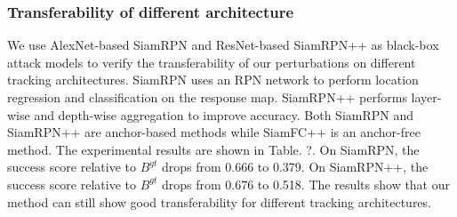 \documentclass{article}
\begin{document}
\begin{table}[ht]
\begin{center}
\end{center}
\caption{Different backbone}
\end{table}

\subsubsection{Transferability of different architecture}

We use AlexNet-based SiamRPN \cite{SiamRPN} and ResNet-based SiamRPN++ \cite{SiamRPN++} as black-box attack models to verify the transferability of our perturbations on different tracking architectures.
SiamRPN uses an RPN network to perform location regression and classification on the response map. SiamRPN++ performs layer-wise and depth-wise aggregation to improve accuracy. Both SiamRPN and SiamRPN++ are anchor-based methods while SiamFC++ is an anchor-free method.
The experimental results are shown in Table. ?. On SiamRPN, the success score relative to $B^{gt}$ drops from 0.666 to 0.379. On SiamRPN++, the success score relative to $B^{gt}$ drops from 0.676 to 0.518. The results show that our method can still show good transferability for different tracking architectures.
\end{document}
